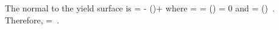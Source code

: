   The normal to the yield surface is
  \Beq
    \BN =  - \Third \Tr\left(\right)\BI +
           \BI 
  \Eeq
  where
  \Beq
     =  \Partial{\sigma^\xi_\Teq}{\Bxi}
      =   \frac{\Bxi}{\Norm{\Bxi}{}}
    \quad \implies \quad
    \Tr\left(\right) = 0 
  \Eeq
  and
  \Beq
     = 
      \exp \left(\right) \,.
  \Eeq
  Therefore,
  \Beq
    \BN =  \,.
  \Eeq


